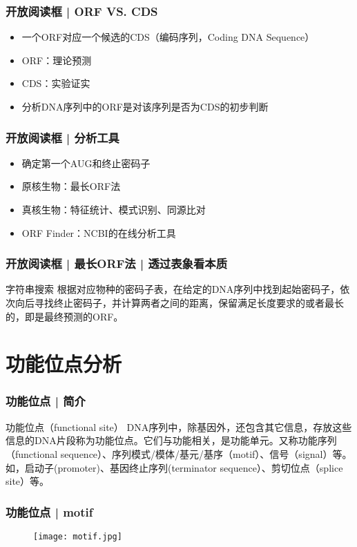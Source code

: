 \begin{frame}
  \frametitle{开放阅读框 | \alert{ORF VS. CDS}}
  \pause
  \begin{itemize}
    \item 一个ORF对应一个候选的CDS（编码序列，Coding DNA Sequence）
    \item ORF：理论预测
    \item CDS：实验证实
    \item 分析DNA序列中的ORF是对该序列是否为CDS的初步判断
  \end{itemize}
\end{frame}

\begin{frame}
  \frametitle{开放阅读框 | 分析工具}
  \begin{itemize}
    \item 确定第一个AUG和终止密码子
    \item 原核生物：最长ORF法
    \item 真核生物：特征统计、模式识别、同源比对
    \item ORF Finder：NCBI的在线分析工具
  \end{itemize}
\end{frame}

\begin{frame}
  \frametitle{开放阅读框 | 最长ORF法 | 透过表象看本质}
  \begin{block}{字符串搜索}
  根据对应物种的密码子表，在给定的DNA序列中找到起始密码子，依次向后寻找终止密码子，并计算两者之间的距离，保留满足长度要求的或者最长的，即是最终预测的ORF。
  \end{block}
\end{frame}

\section{功能位点分析}
\begin{frame}
  \frametitle{功能位点 | 简介}
  \begin{block}{功能位点（functional site）}
    DNA序列中，除基因外，还包含其它信息，存放这些信息的DNA片段称为功能位点。它们与功能相关，是功能单元。又称功能序列（functional sequence）、序列模式/模体/基元/基序（motif）、信号（signal）等。如，启动子(promoter)、基因终止序列(terminator sequence）、剪切位点（splice site）等。
  \end{block}
\end{frame}

\begin{frame}
  \frametitle{功能位点 | motif}
  \begin{figure}
    \centering
    \texttt{[image: motif.jpg]}
  \end{figure}
\end{frame}

